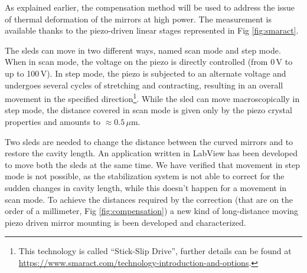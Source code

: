 As explained earlier, the compensation method will be used to address the issue of thermal deformation of the mirrors at high power. The measurement is available thanks to the piezo-driven linear stages represented in Fig \ref{fig:smaract}.

The sleds can move in two different ways, named scan mode and step mode. When in scan mode, the voltage on the piezo is directly controlled (from 0\,V to up to 100\,V). In step mode, the piezo is subjected to an alternate voltage and undergoes several cycles of stretching and contracting, resulting in an overall movement in the specified direction\footnote{This technology is called ``Stick-Slip Drive'', further details can be found at \url{https://www.smaract.com/technology-introduction-and-options}.}. While the sled can move macroscopically in step mode, the distance covered in scan mode is given only by the piezo crystal properties and amounts to $\approx 0.5\,\mu$m.

Two sleds are needed to change the distance between the curved mirrors and to restore the cavity length. An application written in LabView has been developed to move both the sleds at the same time. We have verified that movement in step mode is not possible, as the stabilization system is not able to correct for the sudden changes in cavity length, while this doesn't happen for a movement in scan mode. To achieve the distances required by the correction (that are on the order of a millimeter, Fig \ref{fig:compensation}) a new kind of long-distance moving piezo driven mirror mounting is been developed and characterized.

